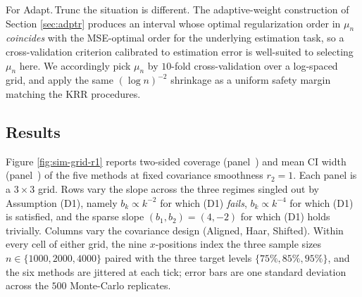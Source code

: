 \documentclass[11pt,a4paper]{article}
\theoremstyle{definition}
\theoremstyle{plain}
\theoremstyle{remark}
\begin{document}
For Adapt.\,Trunc the situation is different. The adaptive-weight construction of Section \ref{sec:adptr} produces an interval whose optimal regularization order in $\mu_n$ \emph{coincides} with the MSE-optimal order for the underlying estimation task, so a cross-validation criterion calibrated to estimation error is well-suited to selecting $\mu_n$ here. We accordingly pick $\mu_n$ by $10$-fold cross-validation over a log-spaced grid, and apply the same $(\log n)^{-2}$ shrinkage as a uniform safety margin matching the KRR procedures.

\subsection{Results}\label{subsec:sim-results}

Figure \ref{fig:sim-grid-r1} reports two-sided coverage (panel~) and mean CI width (panel~) of the five methods at fixed covariance smoothness $r_2=1$. Each panel is a $3\times 3$ grid. Rows vary the slope across the three regimes singled out by Assumption (D1), namely $b_k\propto k^{-2}$ for which (D1) \emph{fails}, $b_k\propto k^{-4}$ for which (D1) is satisfied, and the sparse slope $(b_1,b_2)=(4,-2)$ for which (D1) holds trivially. Columns vary the covariance design (Aligned, Haar, Shifted). Within every cell of either grid, the nine $x$-positions index the three sample sizes $n\in\{1000,2000,4000\}$ paired with the three target levels $\{75\%,85\%,95\%\}$, and the six methods are jittered at each tick; error bars are one standard deviation across the $500$ Monte-Carlo replicates.
\end{document}
